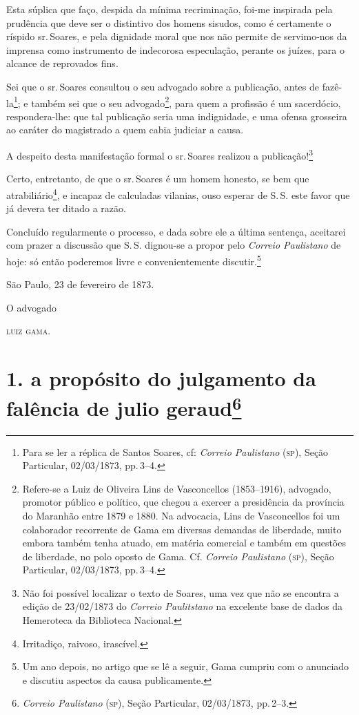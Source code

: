 Esta súplica que faço, despida da mínima recriminação, foi-me inspirada
pela prudência que deve ser o distintivo dos homens sisudos, como é
certamente o ríspido sr.\,Soares, e pela dignidade moral que nos não
permite de servimo-nos da imprensa como instrumento de indecorosa
especulação, perante os juízes, para o alcance de reprovados fins.

Sei que o sr.\,Soares consultou o seu advogado sobre a publicação, antes
de fazê-la\footnote{ Para se ler a réplica de Santos Soares, cf:
  \emph{Correio Paulistano} (\textsc{sp}), Seção Particular, 02/03/1873, pp.\,3--4.};
e também sei que o seu advogado\footnote{ Refere-se a Luiz de Oliveira
  Lins de Vasconcellos (1853--1916), advogado, promotor público e
  político, que chegou a exercer a presidência da província do Maranhão
  entre 1879 e 1880. Na advocacia, Lins de Vasconcellos foi um
  colaborador recorrente de Gama em diversas demandas de liberdade,
  muito embora também tenha atuado, em matéria comercial e também em
  questões de liberdade, no polo oposto de Gama. Cf. \emph{Correio
  Paulistano} (\textsc{sp}), Seção Particular, 02/03/1873, pp.\,3--4.}, para quem a
profissão é um sacerdócio, respondera-lhe: que tal publicação seria uma
indignidade, e uma ofensa grosseira ao caráter do magistrado a quem
cabia judiciar a causa.

A despeito desta manifestação formal o sr.\,Soares realizou a
publicação!\footnote{ Não foi possível localizar o texto de Soares, uma
  vez que não se encontra a edição de 23/02/1873 do \emph{Correio
  Paulitstano} na excelente base de dados da Hemeroteca da Biblioteca
  Nacional.}

Certo, entretanto, de que o sr.\,Soares é um homem honesto, se bem que
atrabiliário\footnote{ Irritadiço, raivoso, irascível.}, e incapaz de
calculadas vilanias, ouso esperar de S.\,S. este favor que já devera ter
ditado a razão.

Concluído regularmente o processo, e dada sobre ele a última sentença,
aceitarei com prazer a discussão que S.\,S. dignou-se a propor pelo
\emph{Correio Paulistano} de hoje: só então poderemos livre e
convenientemente discutir.\footnote{ Um ano depois, no artigo que se lê
  a seguir, Gama cumpriu com o anunciado e discutiu aspectos da causa
  publicamente.}

São Paulo, 23 de fevereiro de 1873.

O advogado

\textsc{luiz gama}.

\chapter{1. a propósito do julgamento da falência de julio geraud\footnote{\emph{Correio Paulistano} (\textsc{sp}), Seção Particular,
  02/03/1873, pp.\,2--3.}} %

